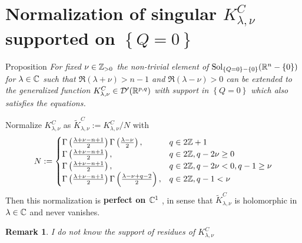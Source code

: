 \documentclass[8pt,pdf,notes]{beamer}
\newcommand{\Sol}{\mbox{Sol}}
\newcommand{\D}{\mathcal{D}}
\newenvironment{prop}{\begin{exampleblock}{Proposition}\it}{\end{exampleblock}}
\theoremstyle{mystyle}
\newtheorem*{remark}{Remark}
\begin{document}
\section{Normalization of singular ${K}^C_{ \lambda,\nu }$ supported on $\left\{ Q=0 \right\}$}
\begin{frame}
\begin{prop}
	For fixed $\nu\in\mathbb{Z}_{ >0 }$
	the non-trivial element of $\Sol_{\mycbra{Q=0}-\mycbra{0}}(\R^n-\mycbra{0})$ for $\lambda\in\mathbb{C}$ such that 
	$\Re(\lambda+\nu)>n-1$ and $\Re(\lambda-\nu)>0$ can be extended to the generalized function 
	$K_{\lambda,\nu}^C\in\D'(\R^{p,q})$ with support in $\left\{ Q=0 \right\}$ which also satisfies the equations.
\end{prop}
\begin{theorem}[$O(p+1,q+1),\;n:=p+q$]
	Normalize $K^C_{ \lambda,\nu }$ as $\tilde{K}^C_{\lambda,\nu}:=K^C_{\lambda,\nu}/N$ with\[
		N:=\begin{cases}
		\Gamma\left( \frac{\lambda+\nu-n+1}{2} \right)\Gamma\left( \frac{\lambda-\nu}{2} \right),&q\in2\mathbb{Z}+1\\
		\Gamma\left( \frac{\lambda+\nu-n+1}{2} \right),&q\in2\mathbb{Z},q-2\nu\ge0\\
		\Gamma\left( \frac{\lambda+\nu-n+1}{2} \right),&q\in2\mathbb{Z},q-2\nu<0,q-1\ge\nu\\
		\Gamma\left( \frac{\lambda+\nu-n+1}{2} \right)\Gamma\left( \frac{\lambda-\nu+q-2}{2} \right),&q\in2\mathbb{Z},q-1<\nu\\
		\end{cases}
	\]
	Then this normalization is {\bf perfect on $\mathbb{C}^1$}
	, in sense that $\tilde{K}_{\lambda,\nu}^C$ is holomorphic in $\lambda\in\mathbb{C}$ and
	never vanishes.
\end{theorem}
\begin{remark}
	I do not know the support of residues of $K^C_{\lambda,\nu}$
\end{remark}
\end{frame}
\end{document}
